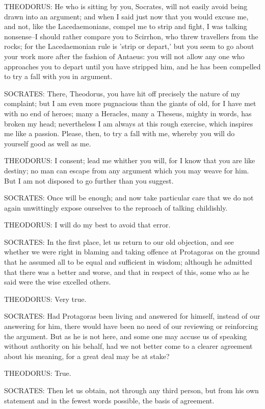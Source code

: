 THEODORUS: He who is sitting by you, Socrates, will not easily avoid
being drawn into an argument; and when I said just now that you would
excuse me, and not, like the Lacedaemonians, compel me to strip and
fight, I was talking nonsense--I should rather compare you to Scirrhon,
who threw travellers from the rocks; for the Lacedaemonian rule is
'strip or depart,' but you seem to go about your work more after the
fashion of Antaeus: you will not allow any one who approaches you to
depart until you have stripped him, and he has been compelled to try a
fall with you in argument.

SOCRATES: There, Theodorus, you have hit off precisely the nature of my
complaint; but I am even more pugnacious than the giants of old, for I
have met with no end of heroes; many a Heracles, many a Theseus, mighty
in words, has broken my head; nevertheless I am always at this rough
exercise, which inspires me like a passion. Please, then, to try a fall
with me, whereby you will do yourself good as well as me.

THEODORUS: I consent; lead me whither you will, for I know that you are
like destiny; no man can escape from any argument which you may weave
for him. But I am not disposed to go further than you suggest.

SOCRATES: Once will be enough; and now take particular care that we
do not again unwittingly expose ourselves to the reproach of talking
childishly.

THEODORUS: I will do my best to avoid that error.

SOCRATES: In the first place, let us return to our old objection, and
see whether we were right in blaming and taking offence at Protagoras
on the ground that he assumed all to be equal and sufficient in wisdom;
although he admitted that there was a better and worse, and that in
respect of this, some who as he said were the wise excelled others.

THEODORUS: Very true.

SOCRATES: Had Protagoras been living and answered for himself, instead
of our answering for him, there would have been no need of our reviewing
or reinforcing the argument. But as he is not here, and some one may
accuse us of speaking without authority on his behalf, had we not better
come to a clearer agreement about his meaning, for a great deal may be
at stake?

THEODORUS: True.

SOCRATES: Then let us obtain, not through any third person, but from his
own statement and in the fewest words possible, the basis of agreement.

